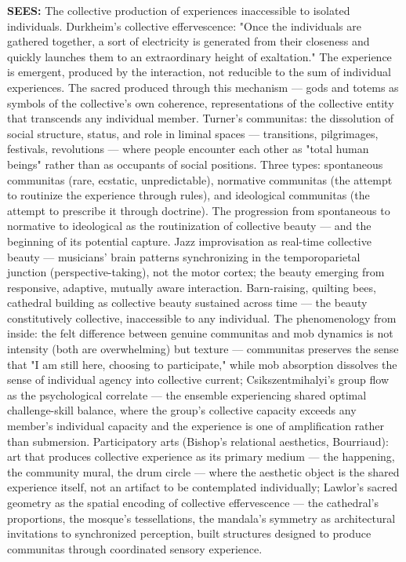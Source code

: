 \textbf{SEES:} The collective production of experiences inaccessible to isolated individuals. Durkheim's collective effervescence: "Once the individuals are gathered together, a sort of electricity is generated from their closeness and quickly launches them to an extraordinary height of exaltation." The experience is emergent, produced by the interaction, not reducible to the sum of individual experiences. The sacred produced through this mechanism — gods and totems as symbols of the collective's own coherence, representations of the collective entity that transcends any individual member. Turner's communitas: the dissolution of social structure, status, and role in liminal spaces — transitions, pilgrimages, festivals, revolutions — where people encounter each other as "total human beings" rather than as occupants of social positions. Three types: spontaneous communitas (rare, ecstatic, unpredictable), normative communitas (the attempt to routinize the experience through rules), and ideological communitas (the attempt to prescribe it through doctrine). The progression from spontaneous to normative to ideological as the routinization of collective beauty — and the beginning of its potential capture. Jazz improvisation as real-time collective beauty — musicians' brain patterns synchronizing in the temporoparietal junction (perspective-taking), not the motor cortex; the beauty emerging from responsive, adaptive, mutually aware interaction. Barn-raising, quilting bees, cathedral building as collective beauty sustained across time — the beauty constitutively collective, inaccessible to any individual. The phenomenology from inside: the felt difference between genuine communitas and mob dynamics is not intensity (both are overwhelming) but texture — communitas preserves the sense that "I am still here, choosing to participate," while mob absorption dissolves the sense of individual agency into collective current; Csikszentmihalyi's group flow as the psychological correlate — the ensemble experiencing shared optimal challenge-skill balance, where the group's collective capacity exceeds any member's individual capacity and the experience is one of amplification rather than submersion. Participatory arts (Bishop's relational aesthetics, Bourriaud): art that produces collective experience as its primary medium — the happening, the community mural, the drum circle — where the aesthetic object is the shared experience itself, not an artifact to be contemplated individually; Lawlor's sacred geometry as the spatial encoding of collective effervescence — the cathedral's proportions, the mosque's tessellations, the mandala's symmetry as architectural invitations to synchronized perception, built structures designed to produce communitas through coordinated sensory experience.


